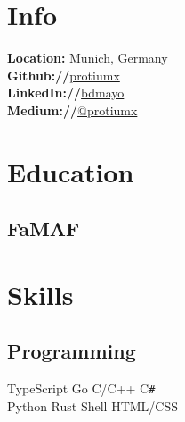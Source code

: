 \documentclass[]{resume}
\begin{document}
%
%

%
%

\begin{minipage}[t]{0.33\textwidth} 
\ello

\section{Info}
\textbf{Location:} Munich, Germany\\
\textbf{Github://}\href{https://github.com/protiumx}{protiumx}\\
\textbf{LinkedIn://}\href{https://www.linkedin.com/in/bdmayo}{bdmayo}\\
\textbf{Medium://}\href{https://medium.com/@protiumx}{@protiumx}


\section{Education} 

\subsection{FaMAF}


\section{Skills}
\ello
\subsection{Programming}

TypeScript \textbullet{} Go \textbullet{} C/C++ \textbullet{} C\texttt{\#} \\
Python \textbullet{} Rust \textbullet{} Shell \textbullet{} HTML/CSS\newline


\end{minipage}
\end{document}

